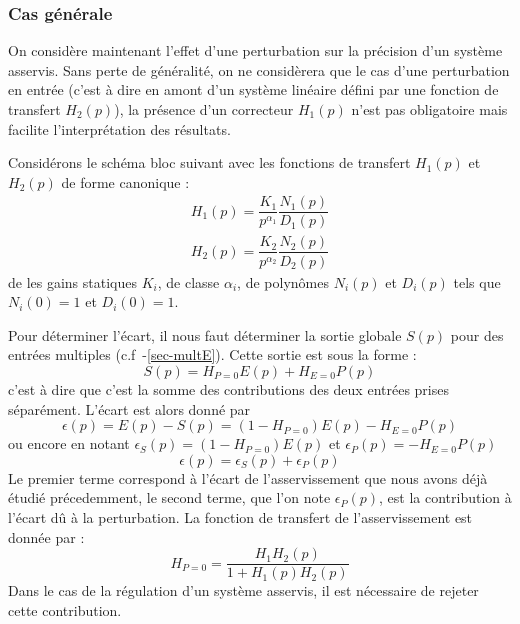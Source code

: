 \subsubsection{Cas générale}
On considère maintenant l'effet d'une perturbation sur la précision d'un 
système asservis.
Sans perte de généralité, on ne considèrera que le cas d'une perturbation 
en entrée (c'est à dire en amont d'un système linéaire défini par une fonction 
de transfert $H_2(p)$), la présence d'un correcteur $H_1(p)$ n'est pas 
obligatoire mais facilite l'interprétation des résultats.

Considérons le schéma bloc suivant avec les fonctions de transfert $H_1(p)$ 
et $H_2(p)$ de forme canonique :
\begin{align*}
    H_1(p)=\dfrac{K_1}{p^{\alpha_1}}\dfrac{N_1(p)}{D_1(p)} \\
    H_2(p)=\dfrac{K_2}{p^{\alpha_2}}\dfrac{N_2(p)}{D_2(p)}
\end{align*}
de les gains statiques $K_i$, de classe $\alpha_i$, de polynômes $N_i(p)$
et $D_i(p)$ tels que $N_i(0)=1$ et $D_i(0)=1$.
\begin{center}
    
\end{center}
Pour déterminer l'écart, il nous faut déterminer la sortie globale $S(p)$ pour
des entrées multiples (c.f~-\cref{sec-multE}).
Cette sortie est sous la forme :
\[
S(p)=H_{P=0}E(p)+H_{E=0}P(p)
\]
c'est à dire que c'est la somme des contributions des deux entrées prises
séparément.
L'écart est alors donné par 
\[
\epsilon(p)=E(p)-S(p)=\left(1-H_{P=0}\right)E(p)-H_{E=0}P(p)
\]
ou encore en notant $\epsilon_S(p)=\left(1-H_{P=0}\right)E(p)$ et 
$\epsilon_P(p)=-H_{E=0}P(p)$
\[
    \epsilon(p)=\epsilon_S(p) + \epsilon_P(p)
\]
Le premier terme correspond à l'écart de l'asservissement que nous avons 
déjà étudié précedemment, le second terme, que l'on 
note $\epsilon_P(p)$, est la contribution à l'écart dû à la perturbation.
La fonction de transfert de l'asservissement est donnée par :
\[
H_{P=0}=\dfrac{H_1H_2(p)}{1+H_1(p)H_2(p)} 
\]
Dans le cas de la régulation d'un système asservis, il est nécessaire de 
rejeter cette contribution.

